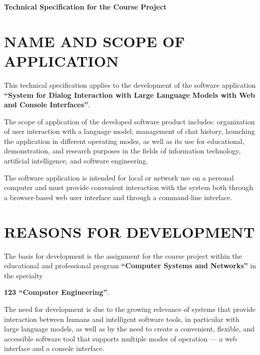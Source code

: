\documentclass[12pt,a4paper]{article}
\begin{document}
    \begin{center} \textbf{\Large Technical Specification for the Course Project} \end{center}

    \vspace{0.5cm}

    \tableofcontents

    \newpage

    \section{NAME AND SCOPE OF APPLICATION}

    This technical specification applies to the development of the software application
    \textbf{``System for Dialog Interaction with Large Language Models with Web and Console Interfaces''}.

    The scope of application of the developed software product includes:
    organization of user interaction with a language model,
    management of chat history, launching the application in different operating modes,
    as well as its use for educational, demonstration, and research purposes
    in the fields of information technology, artificial intelligence, and software engineering.

    The software application is intended for local or network use
    on a personal computer and must provide convenient interaction with the system
    both through a browser-based web user interface and through a command-line interface.

    \section{REASONS FOR DEVELOPMENT}

    The basis for development is the assignment for the course project
    within the educational and professional program
    \textbf{``Computer Systems and Networks''}
    in the specialty

    \noindent
    \textbf{123 ``Computer Engineering''}.

    The need for development is due to the growing relevance of systems
    that provide interaction between humans and intelligent software tools,
    in particular with large language models, as well as by the need to create
    a convenient, flexible, and accessible software tool
    that supports multiple modes of operation --- a web interface and a console interface.
\end{document}
